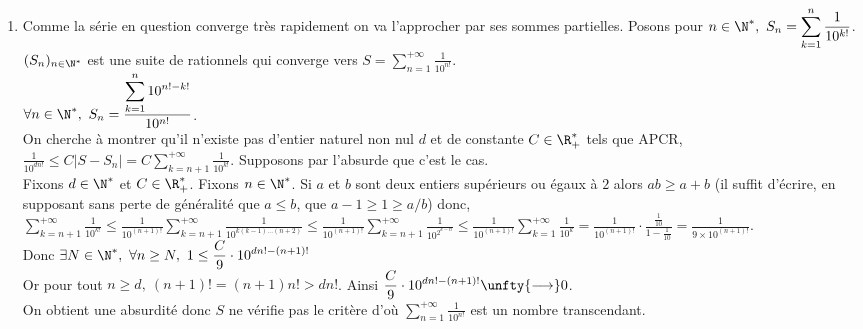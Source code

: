 \documentclass[8pt]{book}
\begin{document}
\begin{enumerate}[leftmargin=*]
		$\displaystyle\left|P\left(\frac{p_n}{q_n}\right)\right|=\left|P\left(\frac{p_n}{q_n}\right)-P(\alpha)\right|\leq M\left|\alpha-\frac{p_n}{q_n}\right|$ avec $M=\sup\limits_{x\in[\alpha-\varepsilon,\alpha+\varepsilon]}|P'(x)|$.\\
		Finalement, $\forall n\geq N,\ \displaystyle\frac{1}{q_n^d}\leq M\left|\alpha-\frac{p_n}{q_n}\right|$ d'où $\displaystyle\frac{1}{q_n^d}\unfty{=}\bigO{\alpha-\frac{p_n}{q_n}}$.\\\\
		\textit{Remarque : ce critère traduit le fait que les nombres algébriques sont en quelque sorte "mal approximable" par les rationnels; dans le sens où, pour approximer un nombre algébrique $\alpha$ par des rationnels $\displaystyle\frac{p_n}{q_n}$, on va être obligé de prendre de grands dénominateurs pour nos rationnels de sorte qu'ils soient de l'ordre de la racine $d$-ième de $\left|\alpha-\displaystyle\frac{p_n}{q_n}\right|$.}
		\item Comme la série en question converge très rapidement on va l'approcher par ses sommes partielles. Posons pour $n\in \N^*,\ S_n=\displaystyle\sum_{k=1}^n\frac{1}{10^{k!}}$.\\
		$(S_n)_{n\in \N^*}$ est une suite de rationnels qui converge vers $S=\displaystyle\sum_{n=1}^{+\infty}\frac{1}{10^{n!}}$.\\
		$\forall n\in \N^*,\ S_n=\displaystyle\frac{\displaystyle\sum_{k=1}^n10^{n!-k!}}{10^{n!}}$.\\
		On cherche à montrer qu'il n'existe pas d'entier naturel non nul $d$ et de constante $C\in \R^*_+$ tels que APCR,\\
		$\displaystyle\frac{1}{10^{dn!}}\leq C|S-S_n|=C\sum_{k=n+1}^{+\infty}\frac{1}{10^{k!}}$. Supposons par l'absurde que c'est le cas.\\
		Fixons $d\in \N^*$ et $C\in \R^*_+$. Fixons $n\in \N^*$. Si $a$ et $b$ sont deux entiers supérieurs ou égaux à $2$ alors $ab\geq a+b$ (il suffit d'écrire, en supposant sans perte de généralité que $a\leq b$, que $a-1\geq 1\geq a/b$) donc,\\
		$\displaystyle\sum_{k=n+1}^{+\infty}\frac{1}{10^{k!}}\leq\frac{1}{10^{(n+1)!}}\sum_{k=n+1}^{+\infty}\frac{1}{10^{k(k-1)\dots(n+2)}}\leq \frac{1}{10^{(n+1)!}}\sum_{k=n+1}^{+\infty}\frac{1}{10^{2^{k-n}}}\leq \frac{1}{10^{(n+1)!}}\sum_{k=1}^{+\infty}\frac{1}{10^k}=\frac{1}{10^{(n+1)!}}\cdot\frac{\displaystyle\frac{1}{10}}{1-\displaystyle\frac{1}{10}}=\frac{1}{9\times10^{(n+1)!}}$.\\
		Donc $\exists N\in \N^*,\ \forall n\geq N,\ 1\leq \displaystyle\frac{C}{9}\cdot 10^{dn!-(n+1)!}$\\
		Or pour tout $n\geq d,\ (n+1)!=(n+1)n!>dn!$. Ainsi $\displaystyle\frac{C}{9}\cdot 10^{dn!-(n+1)!}\unfty{\longrightarrow}0$.\\
		On obtient une absurdité donc $S$ ne vérifie pas le critère d'où $\displaystyle\sum_{n=1}^{+\infty}\frac{1}{10^{n!}}$ est un nombre transcendant.
	\end{enumerate}
	
\end{document}

